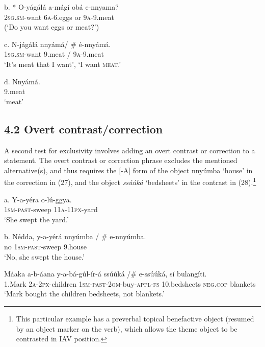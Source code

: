 \documentclass[output=paper]{langsci/langscibook}
\begin{document}
\ea
\gll   b.  * O-yágálá    a-mágí  obá  e-nnyama?\\
         \textsc{2sg}.\textsc{sm}{}-want    \textsc{6a}{}-6.eggs  or  \textsc{9a}{}-9.meat\\
\glt     (‘Do you want eggs or meat?’)
\z

\ea
\gll   c.  N-jágálá    nnyámá/ \# é-nnyámá.\\
         \textsc{1sg}.\textsc{sm}{}-want    9.meat / \textsc{9a}{}-9.meat\\
\glt     ‘It’s meat that I want’, ‘I want \textsc{meat}.’
\z

\ea
\gll   d.  Nnyámá.\\
         9.meat\\
\glt     ‘meat’
\z

\subsection{4.2 Overt contrast/correction}

A second test for exclusivity involves adding an overt contrast or correction to a statement. The overt contrast or correction phrase excludes the mentioned alternative(s), and thus requires the [-A] form of the object nnyúmba ‘house’ in the correction in (27), and the object \textit{ssúúká} ‘bedsheets’ in the contrast in (28).\footnote{ This particular example has a preverbal topical benefactive object (resumed by an object marker on the verb), which allows the theme object to be contrasted in IAV position.}

\ea
\gll   a.  Y-a-yéra    o-lú-ggya.\\
         \textsc{1sm}{}-\textsc{past}{}-sweep  \textsc{11a}{}-\textsc{11px}{}-yard\\
\glt     ‘She swept the yard.’
\z

\ea
\gll   b.  Nédda,  y-a-yérá    nnyúmba / \# e-nnyúmba.\\
         no    \textsc{1sm}{}-\textsc{past}{}-sweep  9.house\\
\glt     ‘No, she swept the house.’
\z

\ea
\gll   Máaka  a-b-áana    y-a-bá-gúl-ír-á        ssúúká /\# e-ssúúká,  sí    bulangíti.\\
       1.Mark  \textsc{2a}{}-\textsc{2px}{}-children  \textsc{1sm}{}-\textsc{past}{}-\textsc{2om}{}-buy-\textsc{appl}{}-\textsc{fs}  10.bedsheets     \textsc{neg}.\textsc{cop}  blankets\\
    ‘Mark bought the children bedsheets, not blankets.’
\z
\end{document}

